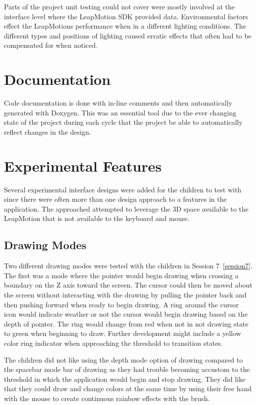Parts of the project unit testing could not cover were mostly involved at the interface level where the LeapMotion SDK provided data. Environmental factors effect the LeapMotions performance when in a different lighting conditions. The different types and positions of lighting caused erratic effects that often had to be compensated for when noticed. 

\section{Documentation}

Code documentation is done with in-line comments and then automatically generated with Doxygen. This was an essential tool due to the ever changing state of the project during each cycle that the project be able to automatically reflect changes in the design. 

\section{Experimental Features}
Several experimental interface designs were added for the children to test with since there were often more than one design approach to a features in the application. The approached attempted to leverage the 3D space available to the LeapMotion that is not available to the keyboard and mouse. 
\subsection{Drawing Modes}

Two different drawing modes were tested with the children in Session 7~\ref{session7}. The first was a mode where the pointer would begin drawing when crossing a boundary on the Z axis toward the screen. The cursor could then be moved about the screen without interacting with the drawing by pulling the pointer back and then pushing forward when ready to begin drawing. A ring around the cursor icon would indicate weather or not the cursor would begin drawing based on the depth of pointer. The ring would change from red when not in not drawing state to green when beginning to draw. Further development might include a yellow color ring indicator when approaching the threshold to transition states. 

The children did not like using the depth mode option of drawing compared to the spacebar mode bar of drawing  as they had trouble becoming accustom to the threshold in which the application would begin and stop drawing. They did like that they could draw and change colors at the same time by using their free hand with the mouse to create continuous rainbow effects with the brush.  

